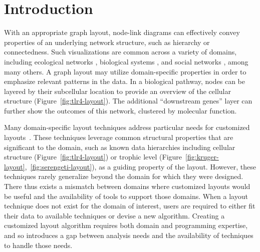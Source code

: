 \section{Introduction}
With an appropriate graph layout, node-link diagrams can
effectively convey properties of an underlying
network structure, such as hierarchy or connectedness. Such visualizations
are common across a variety of domains, including ecological networks
\cite{hinke2004visualizing,harper2006dynamic,lavigne1996cod,baskerville2011spatial,yodzis1998local,cohen2003ecological,kearney2016blog,benson2016higher,kruger2017},
biological systems
\cite{barsky2008cerebral,shannon2003cytoscape,gehlenborg2010visualization,saraiya2005visualizing,becker2001graph,kojima2007efficient,li2005grid},
and social networks
\cite{scott1988social,rothenberg1998using,fitzpatrick2001preventable,mcelroy2003network,fu2011hiv}, 
among many others. A graph layout may utilize
domain-specific properties in order to emphasize relevant patterns in the
data. 
In a biological pathway, nodes can be layered by their
subcellular location to provide an overview of the cellular structure
(Figure~\ref{fig:tlr4-layout}). The additional ``downstream genes'' layer
can further show the outcomes of this network, clustered by molecular function.

\tlrfourLayout

Many domain-specific layout techniques address particular needs
for customized layouts~\cite{barsky2008cerebral,genc2003constrained,shannon2003cytoscape,kearney2017d3,kearney2017ecopath}. These
techniques leverage common structural properties that are significant to the
domain, such as known data hierarchies including cellular 
structure (Figure~\ref{fig:tlr4-layout}) or trophic level
(Figure~\ref{fig:kruger-layout},~\ref{fig:serengeti-layout}), as a guiding property of the
layout. However, these techniques rarely generalize beyond the domain for
which they were designed. There thus exists a mismatch between domains
where customized layouts would be useful and the availability of tools to
support those domains. When a layout technique does not exist for the
domain of interest, users are required to either fit their data
to available techniques or devise a new algorithm. Creating a
customized layout algorithm requires both
domain and programming expertise, and so introduces a gap between 
analysis needs and the availability of techniques to
handle those needs.

